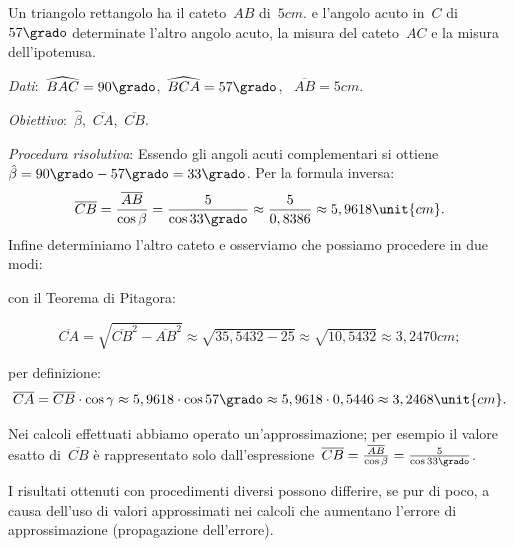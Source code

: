  \begin{esempio}
Un triangolo rettangolo ha il cateto~$AB$ di~$5\unit{cm}$. e l'angolo acuto 
in~$C$ di~$57\grado$ determinate l'altro angolo acuto,
la misura del cateto~$AC$ e la misura dell'ipotenusa.

\emph{Dati}:~$\widehat{BAC}=90\grado$,\quad~$\widehat{BCA}=57\grado$,
\quad~$\overline{AB}=5\unit{cm}$.

\emph{Obiettivo}:~$\hat{\beta}$,\quad~$\overline{CA}$,\quad~$\overline{CB}$.

\emph{Procedura risolutiva}:
Essendo gli angoli acuti complementari si 
ottiene~$\hat{\beta}=90\grado-57\grado=33\grado$.
Per la formula inversa:
\[\overline{CB}=\frac{\overline{AB}}{\cos 
\beta}=\frac{5}{\cos 33\grado} 
\approx\frac{5}{0,8386}\approx5,9618\unit{cm}.\]
Infine determiniamo l'altro cateto e osserviamo che possiamo procedere in due 
modi:
\begin{itemize*}
 \item con il Teorema di Pitagora:
 
\[\overline{CA}=\sqrt{\overline{CB}^{2}-\overline{AB}^{2}}\approx\sqrt{35,
5432-25}\approx\sqrt{10,5432}\approx3,2470\unit{cm};\]
 \item per definizione:
 \[\overline{CA}=\overline{CB}\cdot \cos \gamma\approx5,9618 \cdot 
\cos 57\grado \approx5,9618\cdot 0,5446\approx3,2468\unit{cm}.\]
\end{itemize*}
\osservazione
\begin{enumeratea}
\item Nei calcoli effettuati abbiamo operato un'approssimazione; per esempio 
il 
valore esatto di~$\overline{CB}$ è rappresentato solo
dall'espressione~$\overline{CB}=\frac{\overline{AB}}{\cos 
\beta}=\frac{5}{\cos 33\grado}$.
\item I risultati ottenuti con procedimenti diversi possono differire, se pur 
di 
poco, a causa dell'uso di valori approssimati
nei calcoli che aumentano l'errore di approssimazione (propagazione 
dell'errore).
\end{enumeratea}
 \end{esempio}

